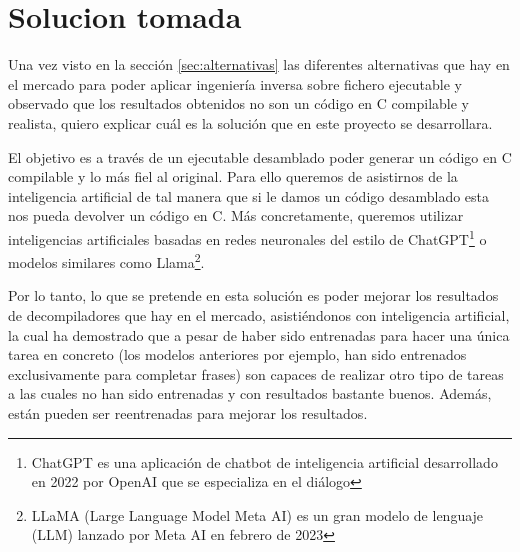 \section{Solucion tomada}
\label{sec:solucion}


Una vez visto en la sección \ref{sec:alternativas} las diferentes alternativas que hay en el mercado para poder aplicar ingeniería inversa sobre fichero ejecutable y observado que los
resultados obtenidos no son un código en C compilable y realista, quiero explicar cuál es la solución que en este proyecto se desarrollara.

El objetivo es a través de un ejecutable desamblado poder generar un código en C compilable y lo más fiel al original. Para ello queremos de asistirnos de la inteligencia artificial
de tal manera que si le damos un código desamblado esta nos pueda devolver un código en C. Más concretamente, queremos utilizar inteligencias artificiales basadas en redes neuronales
del estilo de ChatGPT\footnote{ChatGPT es una aplicación de chatbot de inteligencia artificial desarrollado en 2022 por OpenAI que se especializa en el diálogo} o modelos similares
como Llama\footnote{LLaMA (Large Language Model Meta AI) es un gran modelo de lenguaje (LLM) lanzado por Meta AI en febrero de 2023}.

Por lo tanto, lo que se pretende en esta solución es poder mejorar los resultados de decompiladores que hay en el mercado, asistiéndonos con inteligencia artificial, la cual ha demostrado
que a pesar de haber sido entrenadas para hacer una única tarea en concreto (los modelos anteriores por ejemplo, han sido entrenados exclusivamente para completar frases) son capaces de
realizar otro tipo de tareas a las cuales no han sido entrenadas y con resultados bastante buenos. Además, están pueden ser reentrenadas para mejorar los resultados.
